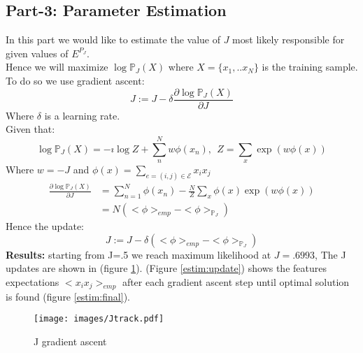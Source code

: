 \documentclass[11pt]{article}
\theoremstyle{exo}
\newcommand{\p}{\mathbb{P}}
\newcommand{\1}{\mathbbm{1}}
\begin{document}
	\subsection{Part-3: Parameter Estimation}
		In this part we would like to estimate the value of $J$ most likely responsible for given values of $E^{P_J}$.\\
		Hence we will maximize $\log \p_J(X)$ where $X=\{x_1,..x_N\}$ is the training sample.\\
		To do so we use gradient ascent:
		\[J:=J-\delta \frac{\partial \log \p_J(X)}{\partial J}\]
		Where $\delta$ is a learning rate.\\
		Given that:
		\[\log \p_J(X)=-ı\log Z+\sum_n^Nw\phi(x_n),\:\:Z=\sum_x\exp(w\phi(x))\]
		Where $w=-J$ and $\phi(x)=\sum\limits_{e=(i,j)\in\mathcal E}x_ix_j$
		\[\begin{split}
		\frac{\partial \log \p_J(X)}{\partial J}&=\sum_{n=1}^N\phi(x_n)-\frac{N}{Z}\sum_x\phi(x)\exp(w\phi(x))\\
		&=N(<\phi>_{emp}-<\phi>_{\p_J})
		\end{split}\]
		Hence the update:
		\[J:=J-\delta(<\phi>_{emp}-<\phi>_{\p_J})\]
		\textbf{Results:} starting from J=.5 we reach maximum likelihood at $J=.6993$, The J updates are shown in (figure \ref{jtrack}). (Figure \ref{estim:update}) shows the features expectations $<x_ix_j>_{emp}$ after each gradient ascent step until optimal solution is found (figure \ref{estim:final}).
		\begin{figure}[H]
			\centering
			\caption{J gradient ascent\label{jtrack}}
			\texttt{[image: images/Jtrack.pdf]}
		\end{figure}
		\begin{figure}[H]
			\centering
		\end{figure}
\end{document}
